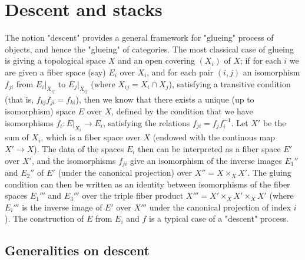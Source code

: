 \section{Descent and stacks}
The notion "descent" provides a general framework for "glueing" process of objects, and hence the "glueing" of categories. The most classical case of glueing is giving a topological space $X$ and an open covering $(X_i)$ of $X$; if for each $i$ we are given a fiber space (say) $E_i$ over $X_i$, and for each pair $(i,j)$ an isomorphism $f_{ji}$ from $E_i|_{X_{ij}}$ to $E_j|_{X_{ij}}$ (where $X_{ij}=X_i\cap X_j$), satisfying a transitive condition (that is, $f_{kj}f_{ji}=f_{ki}$), then we know that there exists a unique (up to isomorphism) space $E$ over $X$, defined by the condition that we have isomorphisms $f_i:E|_{X_i}\to E_i$, satisfying the relations $f_{ji}=f_jf_i^{-1}$. Let $X'$ be the sum of $X_i$, which is a fiber space over $X$ (endowed with the continous map $X'\to X$). The data of the spaces $E_i$ then can be interpreted as a fiber space $E'$ over $X'$, and the isomorphisms $f_{ji}$ give an isomorphism of the inverse images $E_1''$ and $E_2''$ of $E'$ (under the canonical projection) over $X''=X\times_XX'$. The gluing condition can then be written as an identity between isomorphisms of the fiber spaces $E_1'''$ and $E_3'''$ over the triple fiber product $X'''=X'\times_XX'\times_XX'$ (where $E_i'''$ is the inverse image of $E'$ over $X'''$ under the canonical projection of index $i$). The construction of $E$ from $E_i$ and $f$ is a typical case of a "descent" process.

\subsection{Generalities on descent}
